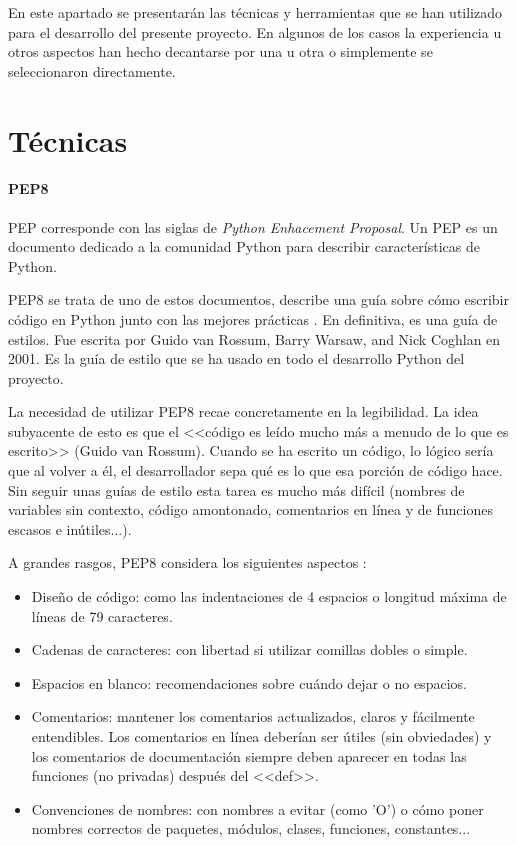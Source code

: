 
En este apartado se presentarán las técnicas y herramientas que se han utilizado
para el desarrollo del presente proyecto. En algunos de los casos la experiencia
u otros aspectos han hecho decantarse por una u otra o simplemente se
seleccionaron directamente.

\section{Técnicas}


\paragraph{PEP8} PEP corresponde con las siglas de \textit{Python Enhacement
Proposal}. Un PEP es un documento dedicado a la comunidad Python para describir
características de Python.

PEP8 se trata de uno de estos documentos, describe una guía sobre cómo escribir
código en Python junto con las mejores prácticas \cite{pep8:desc}. En
definitiva, es una guía de estilos. Fue escrita por Guido van Rossum, Barry
Warsaw, and Nick Coghlan en 2001. Es la guía de estilo que se ha usado en todo
el desarrollo Python del proyecto.

La necesidad de utilizar PEP8 recae concretamente en la legibilidad. La idea
subyacente de esto es que el <<código es leído mucho más a menudo de lo que es
escrito>> (Guido van Rossum). Cuando se ha escrito un código, lo lógico sería
que al volver a él, el desarrollador sepa qué es lo que esa porción de código
hace. Sin seguir unas guías de estilo esta tarea es mucho más difícil (nombres
de variables sin contexto, código amontonado, comentarios en línea y de
funciones escasos e inútiles...).

A grandes rasgos, PEP8 considera los siguientes aspectos \cite{pep8}:

\begin{itemize}
	\item Diseño de código: como las indentaciones de 4 espacios o longitud
	máxima de líneas de 79 caracteres.
	\item Cadenas de caracteres: con libertad si utilizar comillas dobles o
	simple.
	\item Espacios en blanco: recomendaciones sobre cuándo dejar o no espacios.
	\item Comentarios: mantener los comentarios actualizados, claros y
	fácilmente entendibles. Los comentarios en línea deberían ser útiles (sin
	obviedades) y los comentarios de documentación siempre deben aparecer en
	todas las funciones (no privadas) después del <<def>>.
	\item Convenciones de nombres: con nombres a evitar (como 'O') o cómo poner
	nombres correctos de paquetes, módulos, clases, funciones, constantes...
\end{itemize}

